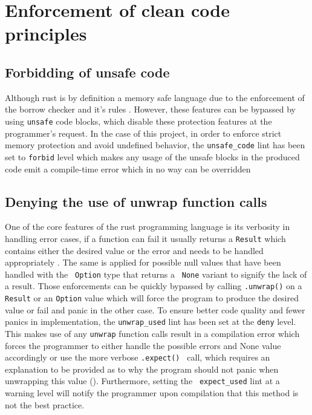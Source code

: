 \section{Enforcement of clean code principles}
\label{clean_code}

    \subsection{Forbidding of unsafe code}
    
    Although rust is by definition a memory safe language due to the enforcement of the borrow checker and it's rules \cite{klabnik_rust_2023}. However, these features can be bypassed by using \verb|unsafe| code blocks, which disable these protection features at the programmer's request.
    In the case of this project, in order to enforce strict memory protection and avoid undefined behavior, the \verb|unsafe_code| lint has been set to \verb|forbid| level which makes any usage of the unsafe blocks in the produced code emit a compile-time error which in no way can be overridden \cite{klabnik_rust_2023}

    \subsection{Denying the use of unwrap function calls}

    One of the core features of the rust programming language is its verbosity in handling error cases, if a function can fail it usually returns a \verb|Result| which contains either the desired value or the error and needs to be handled appropriately \cite{klabnik_recoverable_2023}. The same is applied for possible null values that have been handled with the \verb| Option| type that returns a \verb| None| variant to signify the lack of a result. 
    Those enforcements can be quickly bypassed by calling \verb|.unwrap()| on a \verb|Result| or an \verb|Option| value which will force the program to produce the desired value or fail and panic in the other case.
    To ensure better code quality and fewer panics in implementation, the \verb|unwrap_used| lint has been set at the \verb|deny| level. 
    This makes use of any \verb|unwrap| function calls result in a compilation error which forces the programmer to either handle the possible errors and None value accordingly or use the more verbose \verb|.expect() | call, which requires an explanation to be provided as to why the program should not panic when unwrapping this value (\cite{klabnik_recoverable_2023}). 
    Furthermore, setting the \verb| expect_used| lint at a warning level will notify the programmer upon compilation that this method is not the best practice.

